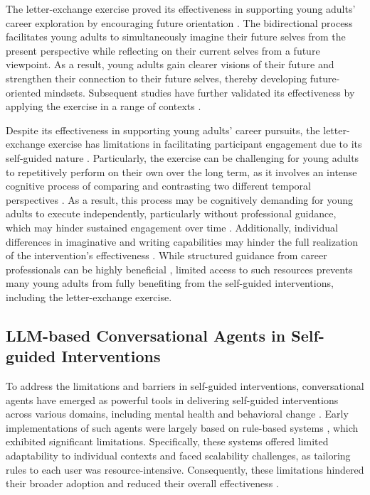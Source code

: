 The letter-exchange exercise proved its effectiveness in supporting young adults' career exploration by encouraging future orientation \cite{chishima2021conversation}. The bidirectional process facilitates young adults to simultaneously imagine their future selves from the present perspective while reflecting on their current selves from a future viewpoint. As a result, young adults gain clearer visions of their future and strengthen their connection to their future selves, thereby developing future-oriented mindsets. Subsequent studies have further validated its effectiveness by applying the exercise in a range of contexts \cite{pownall2024hope, warmath2024letter, chishima2021temporal}.

Despite its effectiveness in supporting young adults’ career pursuits, the letter-exchange exercise has limitations in facilitating participant engagement due to its self-guided nature \cite{10.1145/3613904.3642761, amanvermez2022effects}. Particularly, the exercise can be challenging for young adults to repetitively perform on their own over the long term, as it involves an intense cognitive process of comparing and contrasting two different temporal perspectives \cite{oettingen2012future, oettingen2000expectancy}. As a result, this process may be cognitively demanding for young adults to execute independently, particularly without professional guidance, which may hinder sustained engagement over time \cite{baumel2019objective, fleming2018beyond}. Additionally, individual differences in imaginative and writing capabilities may hinder the full realization of the intervention's effectiveness \cite{cheong2022role, chishima2021conversation, meevissen2011become}. While structured guidance from career professionals can be highly beneficial \cite{amanvermez2022effects, chishima2021temporal, chishima2021conversation}, limited access to such resources prevents many young adults from fully benefiting from the self-guided interventions, including the letter-exchange exercise.

\subsection{LLM-based Conversational Agents in Self-guided Interventions}

To address the limitations and barriers in self-guided interventions, conversational agents have emerged as powerful tools in delivering self-guided interventions across various domains, including mental health \cite{liu_using_2022, greer_use_2019, fitzpatrick_delivering_2017} and behavioral change \cite{gabrielli_chatbot-based_2020, bickmore2005establishing}. Early implementations of such agents were largely based on rule-based systems \cite{abdulrahman2023changing, ly_fully_2017, klein2014intelligent}, which exhibited significant limitations. Specifically, these systems offered limited adaptability to individual contexts and faced scalability challenges, as tailoring rules to each user was resource-intensive. Consequently, these limitations hindered their broader adoption and reduced their overall effectiveness \cite{martins_unlocking_2024}.

